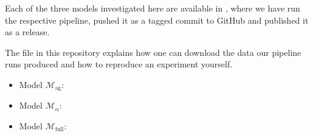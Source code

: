 \begin{tcolorbox}[
    title=\faIcon{recycle} Reproducibility,
    parbox=false,
    float
]
    Each of the three models investigated here are available in , where we have run the respective pipeline, pushed it as a tagged commit to GitHub and published it as a release.

    The  file in this repository explains how one can download the data our pipeline runs produced and how to reproduce an experiment yourself.

    \begin{itemize}
        \item Model $\mathcal{M}_\text{ag}$: 
        \item Model $\mathcal{M}_\alpha$: 
        \item Model $\mathcal{M}_\text{full}$: 
    \end{itemize}
\end{tcolorbox}
